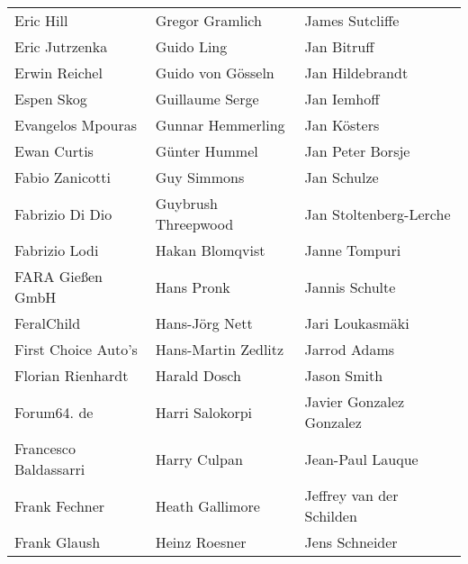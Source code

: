 \begin{tabular}{p{4.5cm}p{4.5cm}p{4.5cm}}
Eric Hill & Gregor Gramlich & James Sutcliffe \\
Eric Jutrzenka & Guido Ling & Jan Bitruff \\
Erwin Reichel & Guido von Gösseln & Jan Hildebrandt \\
Espen Skog & Guillaume Serge & Jan Iemhoff \\
Evangelos Mpouras & Gunnar Hemmerling & Jan Kösters \\
Ewan Curtis & Günter Hummel & Jan Peter Borsje \\
Fabio Zanicotti & Guy Simmons & Jan Schulze \\
Fabrizio Di Dio & Guybrush Threepwood & Jan Stoltenberg-Lerche \\
Fabrizio Lodi & Hakan Blomqvist & Janne Tompuri \\
FARA Gießen GmbH & Hans Pronk & Jannis Schulte \\
FeralChild & Hans-Jörg Nett & Jari Loukasmäki \\
First Choice Auto's & Hans-Martin Zedlitz & Jarrod Adams \\
Florian Rienhardt & Harald Dosch & Jason Smith \\
Forum64. de & Harri Salokorpi & Javier Gonzalez Gonzalez \\
Francesco Baldassarri & Harry Culpan & Jean-Paul Lauque \\
Frank Fechner & Heath Gallimore & Jeffrey van der Schilden \\
Frank Glaush & Heinz Roesner & Jens Schneider \\
\end{tabular}
\newpage
\setlength{\tabcolsep}{1mm}
